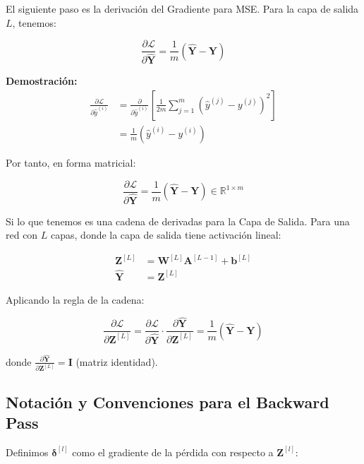 \documentclass[12pt]{article}
\begin{document}
El siguiente paso es la derivación del Gradiente para MSE. Para la capa de salida $L$, tenemos:

\begin{equation}
\frac{\partial \mathcal{L}}{\partial \hat{\mathbf{Y}}} = \frac{1}{m} (\hat{\mathbf{Y}} - \mathbf{Y})
\end{equation}

\textbf{Demostración:}
\begin{align}
\frac{\partial \mathcal{L}}{\partial \hat{y}^{(i)}} &= \frac{\partial}{\partial \hat{y}^{(i)}} \left[\frac{1}{2m} \sum_{j=1}^m (\hat{y}^{(j)} - y^{(j)})^2\right] \\
&= \frac{1}{m} (\hat{y}^{(i)} - y^{(i)})
\end{align}

Por tanto, en forma matricial:

\begin{equation}
\frac{\partial \mathcal{L}}{\partial \hat{\mathbf{Y}}} = \frac{1}{m} (\hat{\mathbf{Y}} - \mathbf{Y}) \in \mathbb{R}^{1 \times m}
\end{equation}

Si lo que tenemos es una cadena de derivadas para la Capa de Salida. Para una red con $L$ capas, donde la capa de salida tiene activación lineal:

\begin{align}
\mathbf{Z}^{[L]} &= \mathbf{W}^{[L]} \mathbf{A}^{[L-1]} + \mathbf{b}^{[L]} \\
\hat{\mathbf{Y}} &= \mathbf{Z}^{[L]}
\end{align}

Aplicando la regla de la cadena:

\begin{equation}
\frac{\partial \mathcal{L}}{\partial \mathbf{Z}^{[L]}} = \frac{\partial \mathcal{L}}{\partial \hat{\mathbf{Y}}} \cdot \frac{\partial \hat{\mathbf{Y}}}{\partial \mathbf{Z}^{[L]}} = \frac{1}{m} (\hat{\mathbf{Y}} - \mathbf{Y})
\end{equation}

donde $\frac{\partial \hat{\mathbf{Y}}}{\partial \mathbf{Z}^{[L]}} = \mathbf{I}$ (matriz identidad).

\subsection{Notación y Convenciones para el Backward Pass}

Definimos $\boldsymbol{\delta}^{[l]}$ como el gradiente de la pérdida con respecto a $\mathbf{Z}^{[l]}$:
\end{document}
